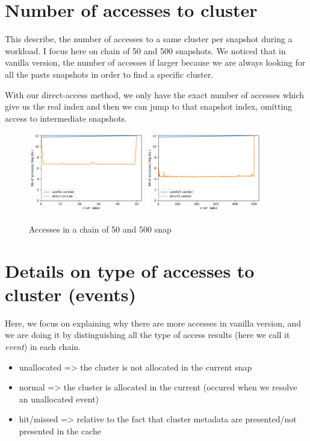 \documentclass[sigplan,screen,10pt]{acmart}
\begin{document}
	\section*{Number of accesses to cluster}
	
	This describe, the number of accesses to a same cluster per snapshot during a workload.
	I focus here on chain of 50 and 500 snapshots.
	We noticed that in vanilla version, the number of accesses if larger because we are always looking for all the pasts snapshots in order to find a specific cluster.
	
	With our direct-access method, we only have the exact number of accesses which give us the real index and then we can jump to that snapshot index, omitting access to intermediate snapshots.
	
	\begin{figure}[h]
		\center
		\includegraphics[width=0.45\textwidth]{clusters_accesses_chain_50.pdf}
		\includegraphics[width=0.45\textwidth]{clusters_accesses_chain_500.pdf}
		\caption{Accesses in a chain of 50 and 500 snap}
		\label{fig:fig2}
	\end{figure}


	\section*{Details on type of accesses to cluster (events)}
	
	Here, we focus on explaining why there are more accesses in vanilla version, and we are doing it by distinguishing all the type of access results (here we call it \textit{event}) in each chain.
	\begin{itemize}
		\item unallocated => the cluster is not allocated in the current snap
		\item normal => the cluster is allocated in the current (occured when we resolve an unallocated event)
		\item hit/missed => relative to the fact that cluster metadata are presented/not presented in the cache
	\end{itemize}
	
\end{document}
